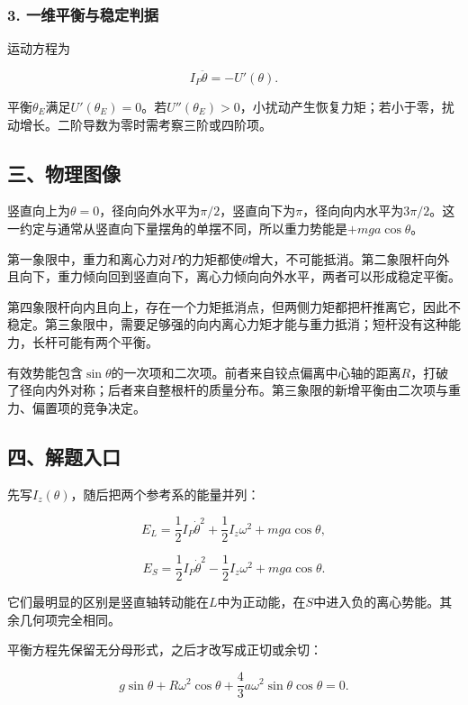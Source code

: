 \documentclass[12pt,a4paper,fontset=fandol]{ctexart}
\begin{document}
\subsubsection{3.
一维平衡与稳定判据}\label{ux4e00ux7ef4ux5e73ux8861ux4e0eux7a33ux5b9aux5224ux636e}

运动方程为

\[
I_P\ddot\theta=-U'(\theta).
\]

平衡\(\theta_E\)满足\(U'(\theta_E)=0\)。若\(U''(\theta_E)>0\)，小扰动产生恢复力矩；若小于零，扰动增长。二阶导数为零时需考察三阶或四阶项。

\subsection{三、物理图像}\label{ux4e09ux7269ux7406ux56feux50cf-3}

竖直向上为\(\theta=0\)，径向向外水平为\(\pi/2\)，竖直向下为\(\pi\)，径向向内水平为\(3\pi/2\)。这一约定与通常从竖直向下量摆角的单摆不同，所以重力势能是\(+mga\cos\theta\)。

第一象限中，重力和离心力对\(P\)的力矩都使\(\theta\)增大，不可能抵消。第二象限杆向外且向下，重力倾向回到竖直向下，离心力倾向向外水平，两者可以形成稳定平衡。

第四象限杆向内且向上，存在一个力矩抵消点，但两侧力矩都把杆推离它，因此不稳定。第三象限中，需要足够强的向内离心力矩才能与重力抵消；短杆没有这种能力，长杆可能有两个平衡。

有效势能包含\(\sin\theta\)的一次项和二次项。前者来自铰点偏离中心轴的距离\(R\)，打破了径向内外对称；后者来自整根杆的质量分布。第三象限的新增平衡由二次项与重力、偏置项的竞争决定。

\subsection{四、解题入口}\label{ux56dbux89e3ux9898ux5165ux53e3-3}

先写\(I_z(\theta)\)，随后把两个参考系的能量并列：

\[
E_L=\frac12I_P\dot\theta^2+\frac12I_z\omega^2+mga\cos\theta,
\]

\[
E_S=\frac12I_P\dot\theta^2-\frac12I_z\omega^2+mga\cos\theta.
\]

它们最明显的区别是竖直轴转动能在\(L\)中为正动能，在\(S\)中进入负的离心势能。其余几何项完全相同。

平衡方程先保留无分母形式，之后才改写成正切或余切：

\[
g\sin\theta+R\omega^2\cos\theta
+\frac43a\omega^2\sin\theta\cos\theta=0.
\]
\end{document}
